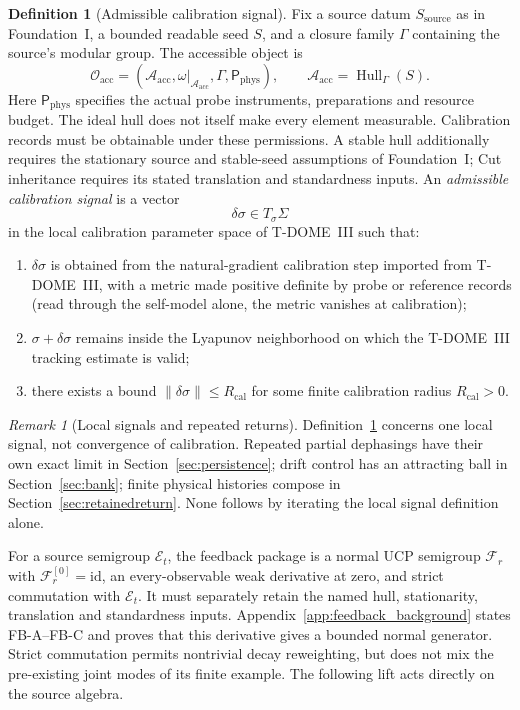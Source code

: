 \documentclass[12pt]{article}
\theoremstyle{definition}
\newtheorem{definition}[theorem]{Definition}
\theoremstyle{remark}
\newtheorem{remark}[theorem]{Remark}
\begin{document}
\begin{definition}[Admissible calibration signal]\label{def:signal}
Fix a source datum \(S_{\mathrm{source}}\) as in Foundation~I,
a bounded readable seed \(S\), and a closure family \(\Gamma\) containing
the source's modular group. The accessible object is
\[
\mathcal O_{\mathrm{acc}}
= (\mathcal A_{\mathrm{acc}},\omega|_{\mathcal A_{\mathrm{acc}}},
       \Gamma,\mathsf P_{\mathrm{phys}}),\qquad
\mathcal A_{\mathrm{acc}}=\operatorname{Hull}_{\Gamma}(S).
\]
Here \(\mathsf P_{\mathrm{phys}}\) specifies the actual probe instruments,
preparations and resource budget. The ideal hull does not itself make
every element measurable. Calibration records must be obtainable under
these permissions. A stable hull additionally requires the stationary
source and stable-seed assumptions of Foundation~I; Cut inheritance
requires its stated translation and standardness inputs.
An \emph{admissible calibration signal} is a vector
\[
\delta\sigma \in T_\sigma\Sigma
\]
in the local calibration parameter space of T-DOME~III such that:
\begin{enumerate}
\item \(\delta\sigma\) is obtained from the natural-gradient calibration
  step imported from T-DOME~III, with a metric made positive definite by
  probe or reference records (read through the self-model alone, the
  metric vanishes at calibration);
\item \(\sigma+\delta\sigma\) remains inside the Lyapunov neighborhood on
  which the T-DOME~III tracking estimate is valid;
\item there exists a bound
  \(\|\delta\sigma\| \leq R_{\mathrm{cal}}\) for some finite
  calibration radius \(R_{\mathrm{cal}}>0\).
\end{enumerate}
\end{definition}

\begin{remark}[Local signals and repeated returns]
Definition~\ref{def:signal} concerns one local signal, not convergence
of calibration. Repeated partial dephasings have their own exact
limit in Section~\ref{sec:persistence}; drift control has an attracting
ball in Section~\ref{sec:bank}; finite physical histories compose in
Section~\ref{sec:retainedreturn}. None follows by iterating the local
signal definition alone.
\end{remark}

For a source semigroup $\mathcal E_t$, the feedback package is a
normal UCP semigroup $\mathscr F_r$ with $\mathscr F_r^{[0]}=\mathrm{id}$,
an every-observable weak derivative at zero, and strict commutation
with $\mathcal E_t$. It must separately retain the named hull,
stationarity, translation and standardness inputs.
Appendix~\ref{app:feedback_background} states FB-A--FB-C and proves
that this derivative gives a bounded normal generator.
Strict commutation permits nontrivial decay reweighting, but does
not mix the pre-existing joint modes of its finite example.
The following lift acts directly on the source algebra.
\end{document}
